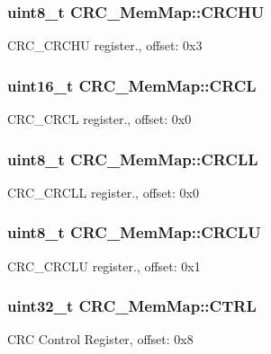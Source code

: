 \subsubsection[{C\+R\+C\+H\+U}]{\setlength{\rightskip}{0pt plus 5cm}uint8\+\_\+t C\+R\+C\+\_\+\+Mem\+Map\+::\+C\+R\+C\+H\+U}\label{struct_c_r_c___mem_map_a6a8a36dbd6cc59ba899a8e7be34d05df}
C\+R\+C\+\_\+\+C\+R\+C\+H\+U register., offset\+: 0x3 \hypertarget{struct_c_r_c___mem_map_ae22498ebf770ee808517eb8c70208759}{}
\subsubsection[{C\+R\+C\+L}]{\setlength{\rightskip}{0pt plus 5cm}uint16\+\_\+t C\+R\+C\+\_\+\+Mem\+Map\+::\+C\+R\+C\+L}\label{struct_c_r_c___mem_map_ae22498ebf770ee808517eb8c70208759}
C\+R\+C\+\_\+\+C\+R\+C\+L register., offset\+: 0x0 \hypertarget{struct_c_r_c___mem_map_a67b4eb3ac1b5f1129cfbc0ba848db17f}{}
\subsubsection[{C\+R\+C\+L\+L}]{\setlength{\rightskip}{0pt plus 5cm}uint8\+\_\+t C\+R\+C\+\_\+\+Mem\+Map\+::\+C\+R\+C\+L\+L}\label{struct_c_r_c___mem_map_a67b4eb3ac1b5f1129cfbc0ba848db17f}
C\+R\+C\+\_\+\+C\+R\+C\+L\+L register., offset\+: 0x0 \hypertarget{struct_c_r_c___mem_map_a5bd8cdac1a017e655a8e9dbb382ce981}{}
\subsubsection[{C\+R\+C\+L\+U}]{\setlength{\rightskip}{0pt plus 5cm}uint8\+\_\+t C\+R\+C\+\_\+\+Mem\+Map\+::\+C\+R\+C\+L\+U}\label{struct_c_r_c___mem_map_a5bd8cdac1a017e655a8e9dbb382ce981}
C\+R\+C\+\_\+\+C\+R\+C\+L\+U register., offset\+: 0x1 \hypertarget{struct_c_r_c___mem_map_ad980a8cdef83fed7e103f88ad051e155}{}
\subsubsection[{C\+T\+R\+L}]{\setlength{\rightskip}{0pt plus 5cm}uint32\+\_\+t C\+R\+C\+\_\+\+Mem\+Map\+::\+C\+T\+R\+L}\label{struct_c_r_c___mem_map_ad980a8cdef83fed7e103f88ad051e155}
C\+R\+C Control Register, offset\+: 0x8 \hypertarget{struct_c_r_c___mem_map_a30abe06fea900d839a8558bd48e0a3a0}{}
